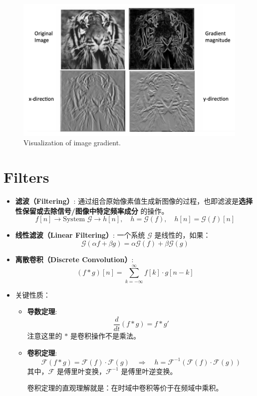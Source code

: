 \begin{figure}[htbp]
    \centering
    \includegraphics[scale=0.3]{figures/VisualizingImageGradient.png}
    \caption{Visualization of image gradient.}
\end{figure}

\clearpage

\section{Filters}
\begin{itemize}
    \item \textbf{滤波（Filtering）}: 通过组合原始像素值生成新图像的过程，也即滤波是\textbf{选择性保留或去除信号/图像中特定频率成分} 的操作。
    $$
    f[n] \rightarrow \text{System } \mathcal{G} \rightarrow h[n], \quad h = \mathcal{G}(f), \quad h[n] = \mathcal{G}(f)[n]
    $$
    \item \textbf{线性滤波（Linear Filtering）}: 一个系统 $ \mathcal{G} $ 是线性的，如果：
    $$
    \mathcal{G}(\alpha f + \beta g) = \alpha \mathcal{G}(f) + \beta \mathcal{G}(g)
    $$
    \item \textbf{离散卷积（Discrete Convolution）}:
    $$
    (f * g)[n] = \sum_{k=-\infty}^{\infty} f[k] \cdot g[n - k]
    $$
    \item 关键性质：
    \begin{itemize}
        \item \textbf{导数定理}: $$\frac{d}{dt}(f * g) = f * g'$$ 注意这里的 $*$ 是卷积操作不是乘法。
        \item \textbf{卷积定理}: 
        $$
        \mathcal{F}(f * g) = \mathcal{F}(f) \cdot \mathcal{F}(g) \quad \Rightarrow \quad h = \mathcal{F}^{-1}(\mathcal{F}(f) \cdot \mathcal{F}(g))
        $$
        其中，$ \mathcal{F} $ 是傅里叶变换，$ \mathcal{F}^{-1} $ 是傅里叶逆变换。
        
        卷积定理的直观理解就是：在时域中卷积等价于在频域中乘积。

    \end{itemize}
\end{itemize}

